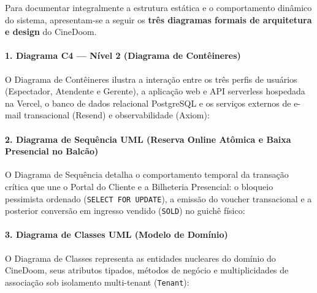 
Para documentar integralmente a estrutura estática e o comportamento dinâmico do sistema, apresentam-se a seguir os \textbf{três diagramas formais de arquitetura e design} do CineDoom.


\paragraph{1. Diagrama C4 --- Nível 2 (Diagrama de Contêineres)}

O Diagrama de Contêineres ilustra a interação entre os três perfis de usuários (Espectador, Atendente e Gerente), a aplicação web e API serverless hospedada na Vercel, o banco de dados relacional PostgreSQL e os serviços externos de e-mail transacional (Resend) e observabilidade (Axiom):



\paragraph{2. Diagrama de Sequência UML (Reserva Online Atômica e Baixa Presencial no Balcão)}

O Diagrama de Sequência detalha o comportamento temporal da transação crítica que une o Portal do Cliente e a Bilheteria Presencial: o bloqueio pessimista ordenado (\texttt{SELECT\ FOR\ UPDATE}), a emissão do voucher transacional e a posterior conversão em ingresso vendido (\texttt{SOLD}) no guichê físico:



\paragraph{3. Diagrama de Classes UML (Modelo de Domínio)}

O Diagrama de Classes representa as entidades nucleares do domínio do CineDoom, seus atributos tipados, métodos de negócio e multiplicidades de associação sob isolamento multi-tenant (\texttt{Tenant}):




